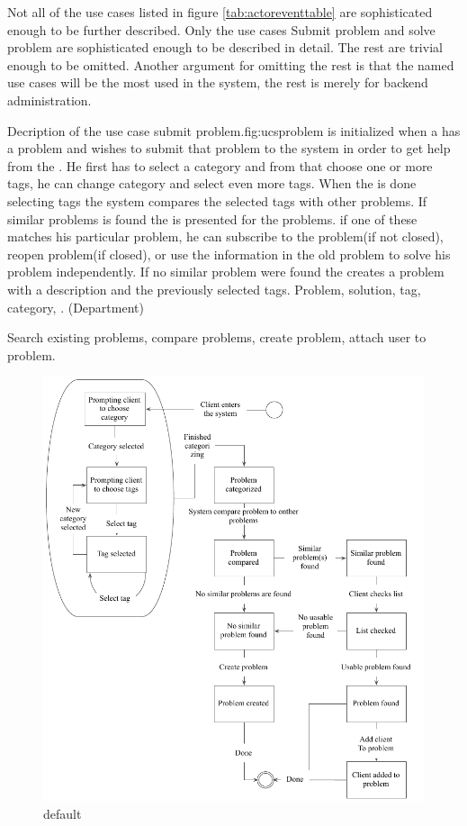 Not all of the use cases listed in figure \ref{tab:actoreventtable} are sophisticated enough to be further described. Only the use cases Submit problem and solve problem are sophisticated enough to be described in detail. The rest are trivial enough to be omitted.
Another argument for omitting the rest is that the named use cases will be the most used in the system, the rest is merely for backend administration. 


\begin{sadlist}[h]{\ucsproblem[c]}{Decription of the use case submit problem.}{fig:ucsproblem}
 \ucsproblem[c] is initialized when a \aclient{} has a problem and wishes to submit that problem to the system in order to get help from the \astaff{}. 
He first has to select a category and from that choose one or more tags, he can change category and select even more tags. 
When the \aclient{} is done selecting tags the system compares the selected tags with other problems. 
If similar problems is found the \aclient{} is presented for the problems.
if one of these matches his particular problem, he can subscribe to the problem(if not closed), reopen problem(if closed), or use the information in the old problem to solve his problem independently. 
If no similar problem were found the \aclient{} creates a problem with a description and the previously selected tags. 
 Problem, solution, tag, category, \client. (Department)

 Search existing problems, compare problems, create problem, attach user to problem.


\end{sadlist}

\begin{figure}[htbp]
\begin{center}
 \includegraphics[scale=1]{input/application_domain_analysis/submit_problem_use_case}
\caption{default}
\label{default}
\end{center}
\end{figure}
